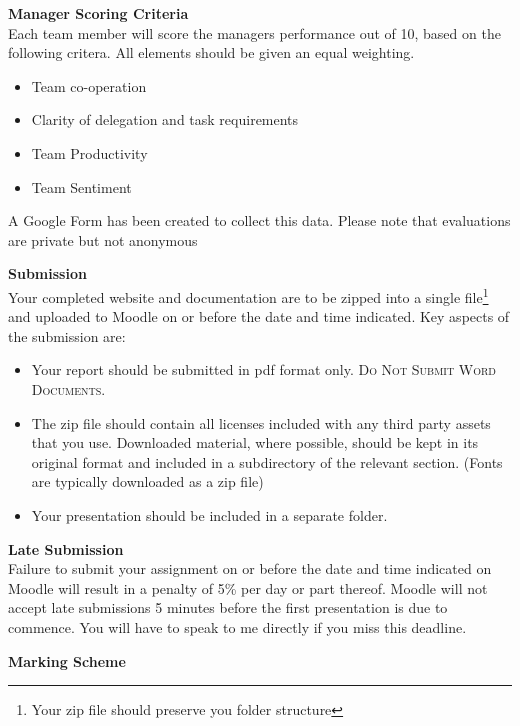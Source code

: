 \textbf{Manager Scoring Criteria}\\
Each team member will score the managers performance out of 10, based on the following critera.  All elements should be given an equal weighting.

\begin{itemize}
	\item Team co-operation
	\item Clarity of delegation and task requirements
	\item Team Productivity
	\item Team Sentiment
\end{itemize}

A Google Form has been created to collect this data.  Please note that evaluations are private but not anonymous





\textbf{Submission}\\
Your completed website and documentation are to be zipped into a single file\footnote{Your zip file should preserve you folder structure} and uploaded to Moodle on or before the date and time indicated.  Key aspects of the submission are:
\begin{itemize}
	\item Your report should be submitted in pdf format only.  \textsc{Do Not Submit Word Documents}.
	\item The zip file should contain all licenses included with any third party assets that you use.  Downloaded material, where possible, should be kept in its original format and included in a subdirectory of the relevant section.  (Fonts are typically downloaded as a zip file)
	\item Your presentation should be included in a separate folder.
\end{itemize}




\textbf{Late Submission}\\
Failure to submit your assignment on or before the date and time indicated on Moodle will result in a penalty of 5\% per day or part thereof.  Moodle will not accept late submissions 5 minutes before the first presentation is due to commence.  You will have to speak to me directly if you miss this deadline.

\vspace{0.5cm}
\textbf{Marking Scheme}\\


